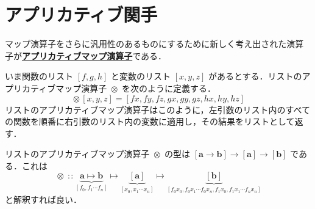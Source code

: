 \documentclass[a5paper,twoside,fleqn,draft]{jsbook}
\def\[{[\![}
\def\]{]\!]}
\newcommand{\programminglanguage}[1]{\textsf{#1}}
\newcommand{\haskell}{\programminglanguage{Haskell}}
\newcommand{\keyword}[1]{{\underline{\textbf{#1}}}}
\newcommand{\code}[1]{\texttt{#1}}
\DeclareMathOperator{\mAppMapList}{\otimes}
\DeclareMathOperator{\mFuncArrow}{\rightarrow}
\DeclareMathOperator{\mIn}{{:\!:}}
\DeclareMathOperator{\mMap}{\cdot}
\DeclareMathOperator{\mMapList}{\odot}
\DeclareMathOperator{\mMapMaybe}{\boxdot}
\newcommand{\mType}[1]{\mathbf{#1}} %
\newcommand{\mA}{\mType{a}}
\newcommand{\mB}{\mType{b}}
\newcommand{\mTypeAssemble}[2]{{}^\mathrm{#1}\[\mType{#2}\]}
\newcommand{\mMaybeType}[1]{\mTypeAssemble{Maybe}{#1}}
\newcommand{\mTypeClass}[1]{\textbf{\textit{#1}}}
\newcommand{\mFunctorTypeClass}{\mTypeClass{Functor}}
\newcommand{\mList}[1]{{#1}_\mathrm{s}}
\newcommand{\mMaybe}[1]{{#1}_?}
\begin{document}




\section{アプリカティブ関手}

マップ演算子をさらに汎用性のあるものにするために新しく考え出された演算子が\keyword{アプリカティブマップ演算子}である．

いま関数のリスト $[f,g,h]$ と変数のリスト $[x,y,z]$ があるとする．リストのアプリカティブマップ演算子 $\mAppMapList$ を次のように定義する．
\begin{equation}
  [f,g,h]\mAppMapList[x,y,z]
  =[fx,fy,fz,gx,gy,gz,hx,hy,hz]
\end{equation}
リストのアプリカティブマップ演算子はこのように，左引数のリスト内のすべての関数を順番に右引数のリスト内の変数に適用し，その結果をリストとして返す．

リストのアプリカティブマップ演算子 $\mAppMapList$ の型は
$[\mA\mFuncArrow\mB]\mFuncArrow[\mA]\mFuncArrow[\mB]$ である．これは
\begin{equation}
  \mAppMapList
  \mIn\underbrace{\mA\mapsto\mB }_{[f_0,f_1\dotsb f_n]}
  \mapsto\underbrace{[\mA]}_{[x_0,x_1\dotsb x_n]}
  \mapsto\underbrace{[\mB]}_{[f_0x_0,f_0x_1\dotsb f_0x_n,f_1x_0,f_1x_1\dotsb f_nx_n]}
\end{equation}
と解釈すれば良い．
\end{document}
